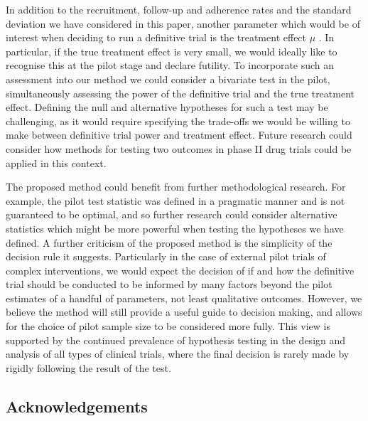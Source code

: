 \documentclass[AMA,STIX1COL]{WileyNJD-v2}
\begin{document}

In addition to the recruitment, follow-up and adherence rates and the standard deviation we have considered in this paper, another parameter which would be of interest when deciding to run a definitive trial is the treatment effect $\mu$ \cite{Wilson2015}. In particular, if the true treatment effect is very small, we would ideally like to recognise this at the pilot stage and declare futility. To incorporate such an assessment into our method we could consider a bivariate test in the pilot, simultaneously assessing the power of the definitive trial and the true treatment effect. Defining the null and alternative hypotheses for such a test may be challenging, as it would require specifying the trade-offs we would be willing to make between definitive trial power and treatment effect. Future research could consider how methods for testing two outcomes in phase II drug trials\cite{Conaway1996, Thall2008} could be applied in this context.


The proposed method could benefit from further methodological research. For example, the pilot test statistic was defined in a pragmatic manner and is not guaranteed to be optimal, and so further research could consider alternative statistics which might be more powerful when testing the hypotheses we have defined. A further criticism of the proposed method is the simplicity of the decision rule it suggests. Particularly in the case of external pilot trials of complex interventions, we would expect the decision of if and how the definitive trial should be conducted to be informed by many factors beyond the pilot estimates of a handful of parameters, not least qualitative outcomes. However, we believe the method will still provide a useful guide to decision making, and allows for the choice of pilot sample size to be considered more fully. This view is supported by the continued prevalence of hypothesis testing in the design and analysis of all types of clinical trials, where the final decision is rarely made by rigidly following the result of the test. 

\subsection*{Acknowledgements}
\end{document}
